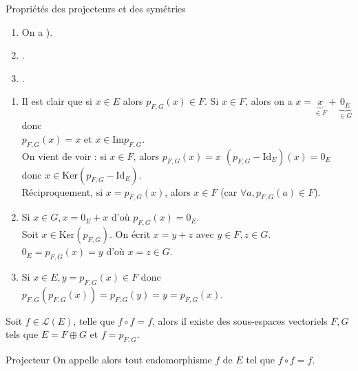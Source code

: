 \documentclass[12pt, a4paper]{report}
\begin{document}
\begin{proposition}{Propriétés des projecteurs et des symétries}{}
\begin{enumerate}
	\item On a ).
	\item {}. 
	\item {}.
\end{enumerate}
\end{proposition}

\begin{demo}{}
\begin{enumerate}
	\item Il est clair que si $x \in E$ alors $p_{F,G}(x) \in F$. Si $x \in F$, alors on a $x = \underbrace{x}_{\in F}+\underbrace{0_E}_{\in G}$ donc \\
	$p_{F,G}(x) = x$ et $x \in \text{Im} p_{F,G}$. \\
	
	On vient de voir : si $x \in F$, alors $p_{F,G} (x) = x$ \ie $(p_{F,G} - \text{Id}_E)(x) = 0_E$ donc $x \in \text{Ker}(p_{F,G} - \text{Id}_E)$. \\
	Réciproquement, si $x = p_{F,G}(x)$, alors $x \in F$ (car $\forall a, p_{F,G}(a) \in F$).
	
	\item Si $x \in G, x  = 0_E + x$ d'où $p_{F,G}(x) = 0_E$. \\
	Soit $x \in \text{Ker}(p_{F,G})$. On écrit $x = y+z$ avec $y \in F, z \in G$. \\
	$0_E = p_{F,G}(x) = y$ d'où $x =z \in G$.
	
	\item Si $x \in E, y = p_{F,G}(x) \in F$ donc $p_{F,G}(p_{F,G}(x)) = p_{F,G}(y) = y = p_{F,G}(x)$.
\end{enumerate}
\end{demo}

\begin{proposition}{}{}
Soit $f \in \mathcal{L}(E)$, telle que $f \circ f = f$, alors il existe des sous-espaces vectoriels $F,G$ tels que $E = F \oplus G$ et $f = p_{F,G}$.
\end{proposition}

\begin{definition}{Projecteur}{}
On appelle alors  tout endomorphisme $f$ de $E$ tel que $f \circ f = f$.
\end{definition}
\end{document}
